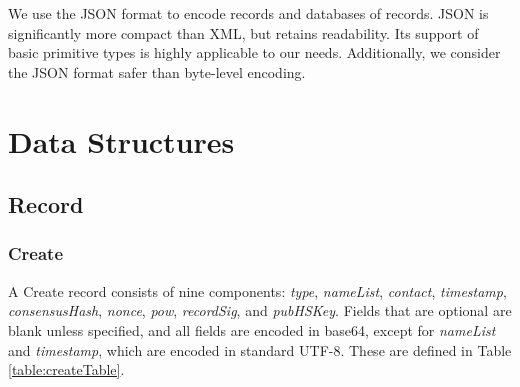We use the JSON format to encode records and databases of records. JSON is significantly more compact than XML, but retains readability. Its support of basic primitive types is highly applicable to our needs. Additionally, we consider the JSON format safer than byte-level encoding.

\section{Data Structures}

\subsection{Record}

\subsubsection{Create}

A Create record consists of nine components: \emph{type}, \emph{nameList}, \emph{contact}, \emph{timestamp}, \emph{consensusHash}, \emph{nonce}, \emph{pow}, \emph{recordSig}, and \emph{pubHSKey}. Fields that are optional are blank unless specified, and all fields are encoded in base64, except for \emph{nameList} and \emph{timestamp}, which are encoded in standard UTF-8. These are defined in Table \ref{table:createTable}.

